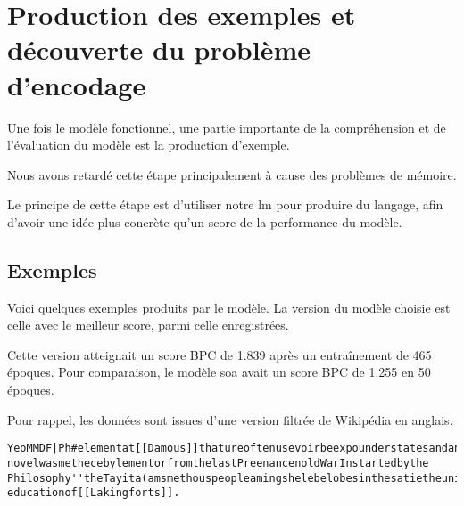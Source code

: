 \section{Production des exemples et découverte du problème d'encodage}
Une fois le modèle fonctionnel, une partie importante de la compréhension et de l'évaluation du modèle est la production d'exemple.

Nous avons retardé cette étape principalement à cause des problèmes de mémoire.

Le principe de cette étape est d'utiliser notre \gls{lm} pour produire du langage, afin d'avoir une idée plus concrète qu'un score de la performance du modèle.

\subsection{Exemples}
Voici quelques exemples produits par le modèle. 
La version du modèle choisie est celle avec le meilleur score, parmi celle enregistrées.

Cette version atteignait un score BPC de 1.839 après un entraînement de 465 époques.
Pour comparaison, le modèle \gls{soa} avait un score BPC de 1.255 en 50 époques.

Pour rappel, les données sont issues d'une version filtrée de Wikipédia en anglais.

\begin{lstlisting}[caption={Exemple 1~: une suite de caractères à priori incompréhensibles.},label=gmsnn_ex1]
YeoMMDF|Ph#elementat[[Damous]]thatureoftenusevoirbeexpounderstatesandanumberofhisworkformembersothan novelwasmethecebylementorfromthelastPreenancenoldWarInstartedbythe Philosophy''theTayita(amsmethouspeopleamingshelebelobesinthesatietheuniversalistscientis educationof[[Lakingforts]].
\end{lstlisting}

